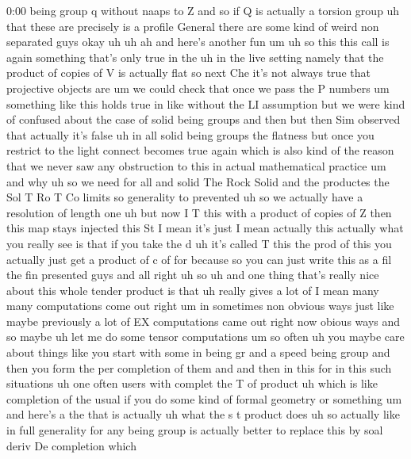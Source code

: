 \begin{unfinished}{0:00}
being  group
q  without  naaps  to
Z
and  so  if  Q  is  actually  a  torsion  group
uh  that  these  are  precisely  is  a  profile
General  there  are  some  kind  of  weird  non
separated
guys  okay  uh
uh  ah  and  here's  another  fun
um  uh  so  this  this  call  is  again
something  that's  only  true  in
the  uh  in  the  live  setting  namely  that
the  product  of  copies  of  V  is  actually
flat  so  next  Che
it's  not  always  true  that  projective
objects  are  um  we  could  check  that  once
we  pass  the  P  numbers  um  something  like
this  holds  true  in  like  without  the  LI
assumption  but  we  were  kind  of  confused
about  the  case  of  solid  being  groups  and
then  but  then  Sim  observed  that  actually
it's  false  uh  in  all  solid  being  groups
the  flatness  but  once  you  restrict  to
the  light  connect  becomes  true
again  which  is  also  kind  of  the  reason
that  we  never  saw  any  obstruction  to
this  in  actual  mathematical  practice
um  and
why  uh  so  we
need  for  all  and
solid  The  Rock  Solid  and  the
productes
the  Sol  T  Ro
T  Co  limits  so
generality  to
prevented  uh  so  we  actually  have  a
resolution  of  length
one
uh  but  now  I  T  this  with  a  product  of
copies  of  Z  then  this  map  stays
injected  this
St  I  mean  it's
just  I  mean  actually
this  actually  what  you  really  see  is
that  if  you  take  the  d  uh  it's  called  T
this  the  prod  of  this  you  actually  just
get  a  product  of  c
of
for
because  so  you  can  just  write  this  as  a
fil  the  fin  presented  guys
and  all  right
uh
so  uh  and  one  thing  that's  really  nice
about  this  whole  tender  product  is  that
uh  really  gives  a  lot  of  I  mean  many
many  computations  come  out  right  um  in
sometimes  non  obvious  ways  just  like
maybe  previously  a  lot  of  EX
computations  came  out  right  now  obious
ways  and  so  maybe  uh  let  me  do  some
tensor
computations
um  so  often
uh  you  maybe  care  about  things
like  you  start  with
some  in  being
gr  and  a  speed  being
group  and  then  you  form  the  per
completion  of  them
and  and  then  in  this  for  in  this  such
situations  uh  one  often  users  with
complet  the  T  of
product  uh  which  is  like  completion  of
the
usual
if  you  do  some  kind  of  formal  geometry
or
something
um  and  here's  a  the  that  is  actually  uh
what  the  s  t  product  does  uh  so  actually
like  in  full  generality  for
any  being  group  is  actually  better  to
replace  this  by  soal  deriv  De  completion
which

\end{unfinished}

